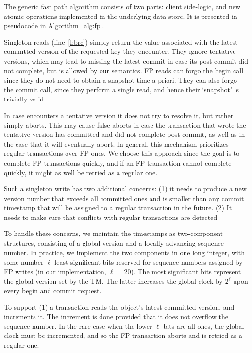 The generic fast  path algorithm consists of two parts: 
client side-logic, and new atomic operations implemented in the  underlying data store.
It is presented in pseudocode in Algorithm~\ref{alg:fp}. 

Singleton reads (line~\ref{l:brc}) simply return the value associated with the  latest committed version of the requested key they encounter.  
They ignore tentative versions, which may lead to missing the latest commit in case its post-commit did not complete, 
but is allowed by our semantics. 
FP reads can forgo the begin call since they do not need to obtain a snapshot time a priori. 
They can also forgo the commit call, since they perform a single read, and hence their `snapshot' is trivially valid.

In case   encounters a tentative version it does not try to resolve it, but rather simply aborts.
This may cause false aborts in case the transaction that wrote the tentative version has committed and did not 
complete post-commit, as well as in the case that it will eventually abort. 
In general, this mechanism prioritizes regular transactions over FP ones. We choose this approach since
the goal is to complete FP transactions quickly, and if an FP transaction cannot complete quickly, it might as well be 
retried as a regular one.
   
Such a singleton write has two additional concerns: (1) it needs to  produce a new version number that exceeds all committed ones and
is smaller than any commit timestamp that will be assigned to a regular transaction in the future.
(2)  It needs to make sure that conflicts with regular transactions are detected. 

To handle these concerns,  
we maintain the timestamps as two-component structures, consisting of a global version and a locally advancing sequence number.
In practice, we implement the two components in one long integer, with some number $\ell$ least significant bits
reserved for sequence numbers assigned by FP writes (in our implementation, $\ell=20$).
The most significant bits represent the global version set by the TM. The latter increases 
the global clock by $2^\ell$ upon every begin and commit request.

To support (1) a {} transaction reads the object's latest committed version, and increments it. 
The increment is done provided that it does not overflow the sequence number. 
In the rare case when the lower $\ell$ bits are all ones, the global clock must be incremented, and so the FP transaction aborts and is retried as a regular one. 

